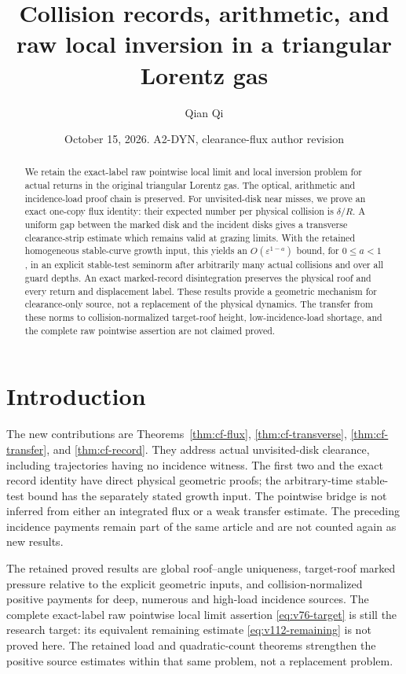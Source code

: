 \documentclass[11pt,reqno]{amsart}
\title[Collision records and raw local inversion]{Collision records, arithmetic, and raw local inversion in a triangular Lorentz gas}
\author{Qian Qi}
\date{October 15, 2026. A2-DYN, clearance-flux author revision}
\numberwithin{equation}{section}
\theoremstyle{definition}\newtheorem{definition}[theorem]{Definition}
\theoremstyle{remark}\newtheorem{remark}[theorem]{Remark}
\begin{document}
\raggedbottom
\begin{abstract}
We retain the exact-label raw pointwise local limit and local inversion
problem for actual returns in the original triangular Lorentz gas.
The optical, arithmetic and incidence-load proof chain is preserved.
For unvisited-disk near misses, we prove an exact one-copy flux
identity: their expected number per physical collision is $\delta/R$.
A uniform gap between the marked disk and the incident disks gives
a transverse clearance-strip estimate which remains valid at grazing
limits. With the retained homogeneous stable-curve growth input,
this yields an $O(\varepsilon^{1-a})$ bound, for $0\le a<1$, in an
explicit stable-test seminorm after arbitrarily many actual
collisions and over all guard depths. An exact marked-record
disintegration preserves the physical roof and every return and
displacement label. These results provide a geometric mechanism for
clearance-only source, not a replacement of the physical dynamics.
The transfer from these norms to collision-normalized target-roof
height, low-incidence-load shortage, and the complete raw pointwise
assertion are not claimed proved.
\end{abstract}
\maketitle

\section*{Introduction}
The new contributions are Theorems~\ref{thm:cf-flux},
\ref{thm:cf-transverse}, \ref{thm:cf-transfer}, and
\ref{thm:cf-record}. They address actual unvisited-disk clearance,
including trajectories having no incidence witness. The first two
and the exact record identity have direct physical geometric proofs;
the arbitrary-time stable-test bound has the separately stated
growth input. The pointwise bridge is not inferred from either an
integrated flux or a weak transfer estimate. The preceding
incidence payments remain part of the same article and are not
counted again as new results.


The retained proved results are global roof--angle
uniqueness, target-roof marked pressure relative to the explicit
geometric inputs, and collision-normalized positive payments for
deep, numerous and high-load incidence sources. The complete
exact-label raw pointwise local limit assertion
\eqref{eq:v76-target} is still the research target: its equivalent
remaining estimate \eqref{eq:v112-remaining} is not proved here.
The retained load and quadratic-count theorems strengthen the positive
source estimates within that same problem, not a replacement problem.
\end{document}
